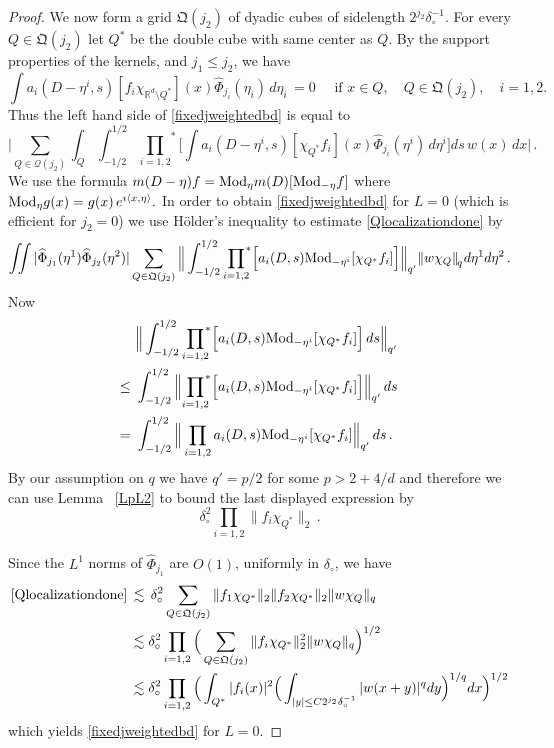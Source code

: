 \documentclass[11pt]{amsart}
\theoremstyle{definition}
\numberwithin{theorem}{section}
\numberwithin{definition}{section}
\def\Mod{\text{{\rm Mod}}}
\def\im{\imath}
\def\prodstar{{\prod_{i=1,2}}^{\!\!*}}
\def\inn#1#2{\langle#1,#2\rangle}
\newcommand{\ci}[1]{_{{}_{\!\scriptstyle{#1}}}}
\newcommand{\Be}{\begin{equation}}
\newcommand{\Ee}{\end{equation}}
\newcommand{\note}[1]{\footnote{\texttt{\Small #1}}}
\def\inn#1#2{\langle#1,#2\rangle}
\def\lc{\lesssim}
\def\fQ{{\mathfrak {Q}}}
\def\bbR{{\mathbb {R}}}
\def\cQ{{\mathcal {Q}}}
\begin{document}
\begin{proof}
We now form a grid $\fQ(j_2)$ of dyadic cubes of sidelength $2^{j_2}\delta_\circ^{-1}$.
For every $Q\in \fQ(j_2)$ let $Q^*$ be the double cube with same center as $Q$.
By the support properties of the kernels, and $j_1\le j_2$,  we have
$$
\int a_i(D-\eta^i,s)[f_i\chi_{\bbR^d\setminus Q^*}](x) \widehat
\Phi_{j_i}(\eta_i)\,d\eta_i \,=0\quad \text{ if } x\in Q, \quad
Q\in \fQ(j_2), \quad i=1,2.$$ Thus the left hand side of
\eqref{fixedjweightedbd} is equal to \Be\label{Qlocalizationdone}
\Big|\sum_{Q\in \cQ(j_2)}\int_{Q} \int_{-1/2}^{1/2}
\prodstar\Big[\int a_i(D-\eta^i,s)[\chi_{Q^*}f_i](x) \widehat
\Phi_{j_i} (\eta^i)\,d\eta^i\Big] ds\,w(x)\,dx \Big|\,. \Ee We use
the formula $m(D-\eta)f= \Mod_\eta m(D) [\Mod_{-\eta }f]$ where
$\Mod_\eta g(x) = g(x)\,e^{\im\inn{x}{\eta}}.$ In order to obtain
\eqref{fixedjweightedbd} for $L=0$ (which is efficient for $j_2=0$)
we use H\"older's inequality to estimate \eqref{Qlocalizationdone}
by \Be \label{nachHoelder} \iint |\widehat \Phi_{j_1}(\eta^1)
\widehat \Phi_{j_2}(\eta^2)| \sum_{Q\in \fQ(j_2)} \Big\|
\int_{-1/2}^{1/2} \prodstar\Big[
a_i(D,s)\Mod_{-\eta^i}[\chi_{Q^*}f_i]\Big]\Big\|_{q'}
\|w\chi_Q\|\ci{q} d\eta^1d\eta^2\,. \Ee Now
\begin{align*}
&\Big\| \int_{-1/2}^{1/2}
\prodstar\Big[
a_i(D,s)\Mod_{-\eta^i}[\chi_{Q^*}f_i]\Big]\,ds\Big\|_{q'}\,
\\
\le\ & \int_{-1/2}^{1/2}
\Big\|
\prodstar\Big[
a_i(D,s)\Mod_{-\eta^i}[\chi_{Q^*}f_i]\Big]\Big\|_{q'}\,ds
\\=\ & \int_{-1/2}^{1/2}
\Big\|
\prod_{i=1,2}
a_i(D,s)\Mod_{-\eta^i}[\chi_{Q^*}f_i]\Big\|_{q'}\,ds\,.
\end{align*}
By our assumption on $q$ we have $q'=p/2$ for some  $p>2+4/d$ and therefore
we can
use Lemma ~\ref{LpL2} to
bound  the last displayed expression by
$$ \delta_\circ^2
\prod_{i=1,2}\|f_i\chi_{Q^*}\|_2\,.$$



Since the $L^1$ norms of $\widehat \Phi_{j_1}$ are $O(1)$, uniformly in $\delta_\circ$,
we have
\begin{align*}
\text{\eqref{Qlocalizationdone}}\,&\lc\,\delta_\circ^2 \sum_{Q\in \fQ(j_2)}\|f_1\chi_{Q^*}\|_2 \|f_2\chi_{Q^*}\|_2 \|w\chi_Q\|_q
\\&\lc \delta_\circ^2 \prod_{i=1,2}
\Big(\sum_{Q\in \fQ(j_2)}\|f_i\chi_{Q^*}\|_2^2
 \|w\chi_Q\|_q\Big)^{1/2}
\\ &\lc \delta_\circ^2 \prod_{i=1,2}
\Big(\int_{Q^*}|f_i(x)|^2\Big(\int_{|y|\le C2^{j_2}\delta_\circ^{-1}}|w(x+y)|^q dy\Big)^{1/q}dx\Big)^{1/2}
\end{align*}
which yields
\eqref{fixedjweightedbd} for $L=0$.


\end{proof}
\end{document}
